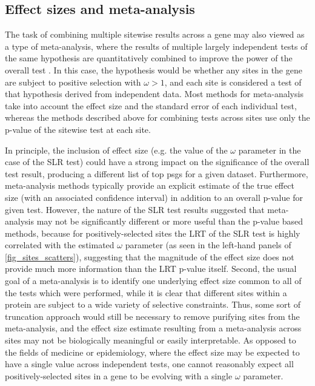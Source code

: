 \subsection{Effect sizes and meta-analysis}


The task of combining multiple sitewise results across a gene may also
viewed as a type of meta-analysis, where the results of multiple
largely independent tests of the same hypothesis are quantitatively
combined to improve the power of the overall test
\citep{Lipsey2001,Stewart2010}. In this case, the hypothesis would be
whether any sites in the gene are subject to positive selection with $\omega>1$, and
each site is considered a test of that hypothesis derived from
independent data. Most methods for meta-analysis take into account the
effect size and the standard error of each individual test, whereas
the methods described above for combining tests across sites use only
the p-value of the sitewise test at each site.

In principle, the inclusion of effect size (e.g. the value of the
$\omega$ parameter in the case of the SLR test) could have a strong
impact on the significance of the overall test result, producing a
different list of top \acp{psg} for a given dataset. Furthermore,
meta-analysis methods typically provide an explicit estimate of the
true effect size (with an associated confidence interval) in addition
to an overall p-value for given test. However, the nature of the SLR
test results suggested that meta-analysis may not be significantly
different or more useful than the p-value based methods, because for
positively-selected sites the LRT of the SLR test is highly correlated
with the estimated $\omega$ parameter (as seen in the left-hand panels
of \ref{fig_sites_scatters}), suggesting that the magnitude of the
effect size does not provide much more information than the LRT
p-value itself. Second, the usual goal of a meta-analysis is to
identify one underlying effect size common to all of the tests which
were performed, while it is clear that different sites within a
protein are subject to a wide variety of selective constraints. Thus,
some sort of truncation approach would still be necessary to remove
purifying sites from the meta-analysis, and the effect size estimate
resulting from a meta-analysis across sites may not be biologically
meaningful or easily interpretable. As opposed to the fields of
medicine or epidemiology, where the effect size may be expected to
have a single value across independent tests, one cannot reasonably
expect all positively-selected sites in a gene to be evolving with a
single $\omega$ parameter.

